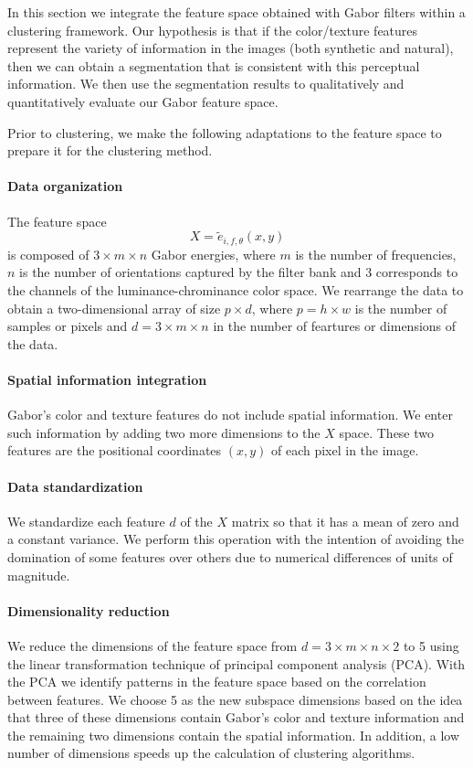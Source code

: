 In this section we integrate the feature space obtained with Gabor filters within a clustering framework. Our hypothesis is that if the color/texture features represent the variety of information in the images (both synthetic and natural), then we can obtain a segmentation that is consistent with this perceptual information. We then use the segmentation results to qualitatively and quantitatively evaluate our Gabor feature space.

Prior to clustering, we make the following adaptations to the feature space to prepare it for the clustering method.

\paragraph{Data organization}
The feature space 
\begin{equation}\label{eq:feature_space}
	X = \widetilde{e}_{i, f, \theta}(x,y)
\end{equation}
is composed of $3 \times m \times n$ Gabor energies, where $m$ is the number of frequencies, $n$ is the number of orientations captured by the filter bank and $3$ corresponds to the channels of the luminance-chrominance color space. We rearrange the data to obtain a two-dimensional array of size $p \times d$, where $p= h\times w$  is the number of samples or pixels and $d =3 \times m \times n$ in the number of feartures or dimensions of the data.


\paragraph{Spatial information integration}
Gabor's color and texture features do not include spatial information. We enter such information by adding two more dimensions to the $X$ space. These two features are the positional coordinates $(x, y)$ of each pixel in the image. 

\paragraph{Data standardization}
We standardize each feature $d$ of the $X$ matrix so that it has a mean of zero and a constant variance. We perform this operation with the intention of avoiding the domination of some features over others due to numerical differences of units of magnitude. 

\paragraph{Dimensionality reduction}
We reduce the dimensions of the feature space from  $d =3 \times m \times n \times 2 $ to 5 using the linear transformation technique of principal component analysis (PCA). With the PCA we identify patterns in the feature space based on the correlation between features. We choose 5 as the new subspace dimensions based on the idea that three of these dimensions contain Gabor's color and texture information and the remaining two dimensions contain the spatial information. In addition, a low number of dimensions speeds up the calculation of clustering algorithms.

